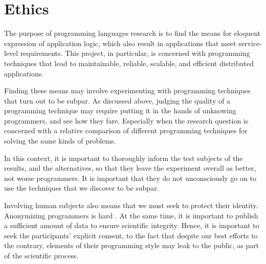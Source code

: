 \section{Ethics}
\label{sec:ethics}

The purpose of programming languages research is to find the means for
eloquent expression of application logic, which also result in
applications that meet service-level requirements. This project, in
particular, is concerned with programming techniques that lead to
maintainable, reliable, scalable, and efficient distributed
applications.

Finding these means may involve experimenting with programming
techniques that turn out to be subpar. As discussed above, judging the
quality of a programming technique may require putting it in the hands
of unknowing programmers, and see how they fare. Especially when
the research question is concerned with a relative comparison of
different programming techniques for solving the same kinds of
problems.

In this context, it is important to thoroughly inform the test
subjects of the results, and the alternatives, so that they leave the
experiment overall as better, not worse programmers. It is important
that they do not unconsciously go on to use the techniques that we
discover to be subpar.

Involving human subjects also means that we must seek to protect their
identity. Anonymizing programmers is hard
\cite{caliskan2015anonymizing, caliskan2018when}. At the same time, it
is important to publish a sufficient amount of data to ensure
scientific integrity. Hence, it is important to seek the participants'
explicit consent, to the fact that despite our best efforts to the
contrary, elements of their programming style may leak to the public,
as part of the scientific process.
